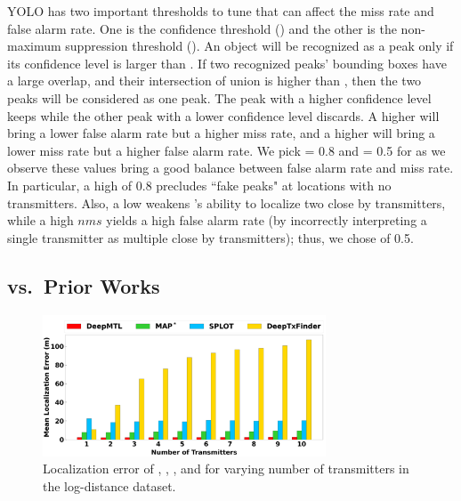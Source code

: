  YOLO has two important thresholds to tune that can affect the miss rate and false alarm rate. 
One is the confidence threshold (\conf) and the other is the non-maximum suppression threshold (\nms).
An object will be recognized as a peak only if its confidence level is larger than \conf.
If two recognized peaks' bounding boxes have a large overlap, and their intersection of union is higher than \nms, then the two peaks will be considered as one peak. 
The peak with a higher confidence level keeps while the other peak with a lower confidence level discards.
A higher \conf will bring a lower false alarm rate but a higher miss rate, and a higher \nms will bring a lower miss rate but a higher false alarm rate.
We pick \conf= 0.8 and \nms= 0.5 for \our as we observe these values bring a good balance between false alarm rate and miss rate.
In particular, a high \conf of 0.8  precludes ``fake peaks" at locations with no transmitters.
Also, a low \nms weakens \our's ability to localize two close by transmitters, while a high $nms$ yields
a high false alarm rate (by incorrectly interpreting a single transmitter as multiple close by transmitters); thus, we chose \nms of 0.5.




\subsection{\our vs.\ Prior Works}
\label{subsec:vs_prior}

\begin{figure}[t]
	\centering
	\includegraphics[width=0.75\textwidth]{chapters/wowmom-pmc/figures/log_distance-error_vary_numintru.png}
	\caption{Localization error of \our, \map, \splot, and \deeptx for varying number of transmitters in the log-distance dataset.}
	\label{fig:logdist-error-vary_numintru}
\end{figure}



